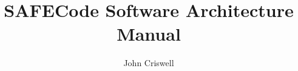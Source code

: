 \documentclass{article}
\begin{document}
\title{\Large \bf SAFECode Software Architecture Manual}

\author{John Criswell}

\maketitle
{}

%
%
%





%
%
\end{document}
